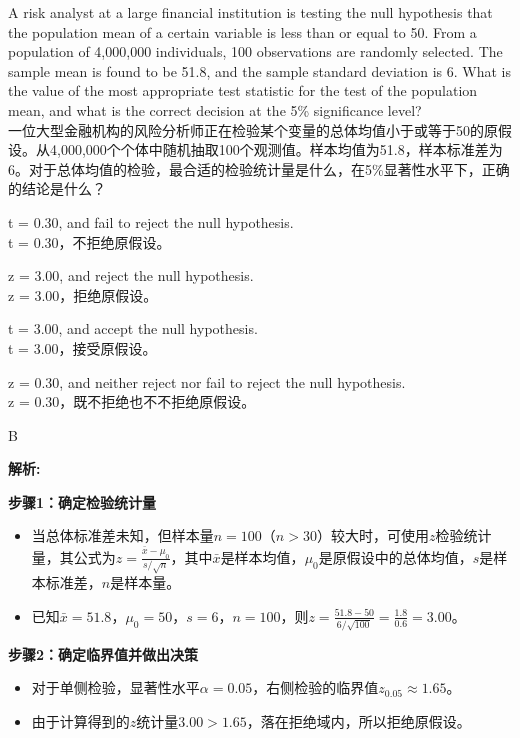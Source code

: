 \documentclass{article}
\newcounter{question} %
\newenvironment{explanation}
{\textbf{解析:}\par}
{\par}
\begin{document}
\begin{question}
A risk analyst at a large financial institution is testing the null hypothesis that the population mean of a certain variable is less than or equal to 50. From a population of 4,000,000 individuals, 100 observations are randomly selected. The sample mean is found to be 51.8, and the sample standard deviation is 6. What is the value of the most appropriate test statistic for the test of the population mean, and what is the correct decision at the 5\% significance level?\\
一位大型金融机构的风险分析师正在检验某个变量的总体均值小于或等于50的原假设。从4,000,000个个体中随机抽取100个观测值。样本均值为51.8，样本标准差为6。对于总体均值的检验，最合适的检验统计量是什么，在5\%显著性水平下，正确的结论是什么？
\end{question}

\begin{choices}
    \item t = 0.30, and fail to reject the null hypothesis.\\
    t = 0.30，不拒绝原假设。
    \item z = 3.00, and reject the null hypothesis.\\
    z = 3.00，拒绝原假设。
    \item t = 3.00, and accept the null hypothesis.\\
    t = 3.00，接受原假设。
    \item z = 0.30, and neither reject nor fail to reject the null hypothesis.\\
    z = 0.30，既不拒绝也不不拒绝原假设。
\end{choices}

\begin{correctanswer}
    B
\end{correctanswer}

\begin{explanation}
\textbf{步骤1：确定检验统计量}
\begin{itemize}
\item 当总体标准差未知，但样本量\(n = 100\)（\(n>30\)）较大时，可使用\(z\)检验统计量，其公式为\(z=\frac{\bar{x}-\mu_{0}}{s/\sqrt{n}}\)，其中\(\bar{x}\)是样本均值，\(\mu_{0}\)是原假设中的总体均值，\(s\)是样本标准差，\(n\)是样本量。
\item 已知\(\bar{x}=51.8\)，\(\mu_{0}=50\)，\(s = 6\)，\(n = 100\)，则\(z=\frac{51.8 - 50}{6/\sqrt{100}}=\frac{1.8}{0.6}=3.00\)。
\end{itemize}
\textbf{步骤2：确定临界值并做出决策}
\begin{itemize}
\item 对于单侧检验，显著性水平\(\alpha = 0.05\)，右侧检验的临界值\(z_{0.05}\approx1.65\)。
\item 由于计算得到的\(z\)统计量\(3.00>1.65\)，落在拒绝域内，所以拒绝原假设。
\end{itemize}
\end{explanation}
\end{document}
